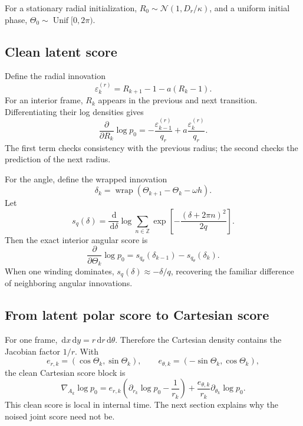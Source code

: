 \documentclass[11pt,a4paper]{article}
\newcommand{\N}{\mathcal{N}}
\newcommand{\dd}{\,\mathrm d}
\newcommand{\wrap}{\operatorname{wrap}}
\begin{document}
For a stationary radial initialization, $R_0\sim\N(1,D_r/\kappa)$, and a uniform initial phase, $\Theta_0\sim\operatorname{Unif}[0,2\pi)$.

\subsection{Clean latent score}

Define the radial innovation
\begin{equation}
 \varepsilon_k^{(r)}=R_{k+1}-1-a(R_k-1).
\end{equation}
For an interior frame, $R_k$ appears in the previous and next transition. Differentiating their log densities gives
\begin{equation}
 \boxed{
 \frac{\partial}{\partial R_k}\log p_0
 =-\frac{\varepsilon_{k-1}^{(r)}}{q_r}
 +a\frac{\varepsilon_k^{(r)}}{q_r}.}
 \label{eq:clean-radial-score}
\end{equation}
The first term checks consistency with the previous radius; the second checks the prediction of the next radius.

For the angle, define the wrapped innovation
\[
 \delta_k=\wrap(\Theta_{k+1}-\Theta_k-\omega h).
\]
Let
\begin{equation}
 s_{q}(\delta)=\frac{\dd}{\dd\delta}\log
 \sum_{n\in\mathbb Z}
 \exp\left[-\frac{(\delta+2\pi n)^2}{2q}\right].
 \label{eq:wrapped-score-function}
\end{equation}
Then the exact interior angular score is
\begin{equation}
 \boxed{
 \frac{\partial}{\partial\Theta_k}\log p_0
 =s_{q_\theta}(\delta_{k-1})-s_{q_\theta}(\delta_k).}
 \label{eq:clean-angular-score}
\end{equation}
When one winding dominates, $s_q(\delta)\approx-\delta/q$, recovering the familiar difference of neighboring angular innovations.

\subsection{From latent polar score to Cartesian score}

For one frame, $\dd x\dd y=r\dd r\dd\theta$. Therefore the Cartesian density contains the Jacobian factor $1/r$. With
\[
 e_{r,k}=(\cos\Theta_k,\sin\Theta_k),
 \qquad
 e_{\theta,k}=(-\sin\Theta_k,\cos\Theta_k),
\]
the clean Cartesian score block is
\begin{equation}
 \boxed{
 \nabla_{A_k}\log p_0
 =e_{r,k}\left(\partial_{r_k}\log p_0-\frac1{r_k}\right)
 +\frac{e_{\theta,k}}{r_k}\partial_{\theta_k}\log p_0.}
 \label{eq:polar-cart-score}
\end{equation}
This clean score is local in internal time. The next section explains why the noised joint score need not be.
\end{document}

